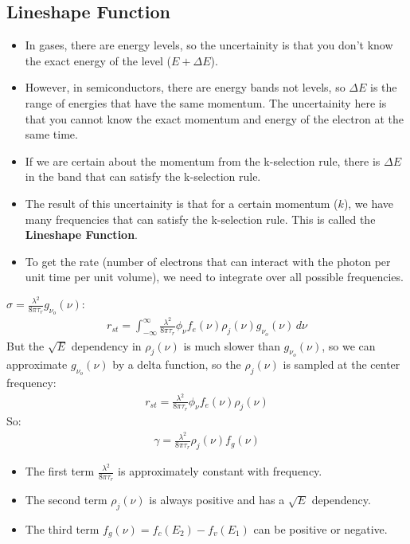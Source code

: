 \documentclass[11pt]{article}
\begin{document}
\subsection{Lineshape Function}
\begin{itemize}
    \item In gases, there are energy levels, so the uncertainity is that you don't know the exact energy of the level ($E + \Delta E$). 
    \item However, in semiconductors, there are energy bands not levels, so $\Delta E$ is the range of energies that have the same momentum. The uncertainity here is that you cannot know the exact momentum and energy of the electron at the same time.
    \item If we are certain about the momentum from the k-selection rule, there is $\Delta E$ in the band that can satisfy the k-selection rule.
    \item The result of this uncertainity is that for a certain momentum ($k$), we have many frequencies that can satisfy the k-selection rule. This is called the \textbf{Lineshape Function}.
    \item To get the rate (number of electrons that can interact with the photon per unit time per unit volume), we need to integrate over all possible frequencies.
\end{itemize}
$\sigma = \frac{\lambda^2}{8 \pi \tau_r} g_{\nu_o}(\nu)$:
\begin{align*}
    r_{st} = \int_{-\infty}^{\infty} \frac{\lambda^2}{8 \pi \tau_r} \phi_\nu f_e (\nu) \rho_j (\nu) g_{\nu_o}(\nu) \, d\nu
\end{align*}
But the $\sqrt{E}$ dependency in $\rho_j (\nu)$ is much slower than $g_{\nu_o}(\nu)$, so we can approximate $g_{\nu_o}(\nu)$ by a delta function, so the $\rho_j (\nu)$ is sampled at the center frequency:
\begin{align*}
    r_{st} = \frac{\lambda^2}{8 \pi \tau_r} \phi_{\nu} f_e (\nu) \rho_j (\nu)
\end{align*}
So:
\begin{align*}
    \gamma = \frac{\lambda^2}{8 \pi \tau_r} \rho_j (\nu) f_g (\nu)
\end{align*}
\begin{itemize}
    \item The first term $\frac{\lambda^2}{8 \pi \tau_r}$ is approximately constant with frequency.
    \item The second term $\rho_j (\nu)$ is always positive and has a $\sqrt{E}$ dependency.
    \item The third term $f_g (\nu) = f_c(E_2) - f_v(E_1)$ can be positive or negative.
\end{itemize}
\end{document}
